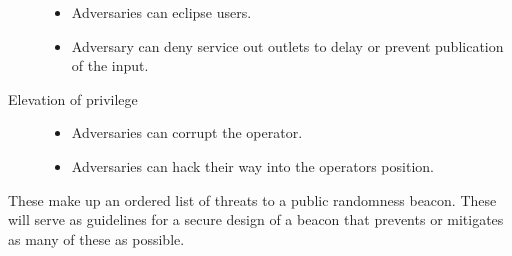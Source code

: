 \begin{description}
\begin{itemize}
                                \item Adversaries can eclipse users. 
                                \item Adversary can deny service out outlets to delay or prevent publication of the input. 
                              \end{itemize}
    \item [Elevation of privilege] \begin{itemize}
                                     \item Adversaries can corrupt the operator. 
                                     \item Adversaries can hack their way into the operators position.  
                                   \end{itemize}
\end{description}

These make up an ordered list of threats to a public randomness beacon. These will serve as guidelines for a secure design of a beacon that prevents or mitigates as many of these as possible. 
